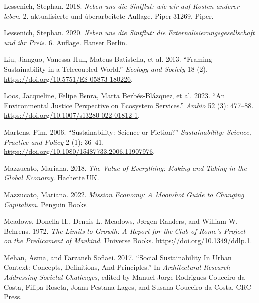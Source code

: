 \documentclass[
  a4paper,
  DIV=11,
  numbers=noendperiod,
  oneside,
  openany]{scrreprt}
\newlength{\cslhangindent}
\newenvironment{CSLReferences}[2] %
 {\begin{list}{}{%
  \setlength{\itemindent}{0pt}
  \setlength{\leftmargin}{0pt}
  \setlength{\parsep}{0pt}
  \ifodd #1
   \setlength{\leftmargin}{\cslhangindent}
   \setlength{\itemindent}{-1\cslhangindent}
  \fi
  \setlength{\itemsep}{#2\baselineskip}}}
 {\end{list}}
\begin{document}
\begin{CSLReferences}{1}{1}
Lessenich, Stephan. 2018. \emph{{Neben uns die Sintflut: wie wir auf
Kosten anderer leben}}. 2. aktualisierte und {ü}berarbeitete Auflage.
{Piper} 31269. Piper.

Lessenich, Stephan. 2020. \emph{{Neben uns die Sintflut: die
Externalisierungsgesellschaft und ihr Preis}}. 6. Auflage. Hanser
Berlin.

{Liu, Jianguo, Vanessa Hull, Mateus Batistella, et al.} 2013. {``Framing
{Sustainability} in a {Telecoupled World}.''} \emph{Ecology and Society}
18 (2). \url{https://doi.org/10.5751/ES-05873-180226}.

Loos, Jacqueline, Felipe Benra, Marta Berbés-Blázquez, et al. 2023.
{``An Environmental Justice Perspective on Ecosystem Services.''}
\emph{Ambio} 52 (3): 477--88.
\url{https://doi.org/10.1007/s13280-022-01812-1}.

Martens, Pim. 2006. {``Sustainability: Science or Fiction?''}
\emph{Sustainability: Science, Practice and Policy} 2 (1): 36--41.
\url{https://doi.org/10.1080/15487733.2006.11907976}.

Mazzucato, Mariana. 2018. \emph{The Value of Everything: {Making} and
Taking in the Global Economy}. Hachette UK.

Mazzucato, Mariana. 2022. \emph{Mission Economy: A Moonshot Guide to
Changing Capitalism}. Penguin Books.

Meadows, Donella H., Dennis L. Meadows, Jørgen Randers, and William W.
Behrens. 1972. \emph{The {Limits} to {Growth}: {A} Report for the {Club}
of {Rome}'s {Project} on the {Predicament} of {Mankind}}. Universe
Books. \url{https://doi.org/10.1349/ddlp.1}.

Mehan, Asma, and Farzaneh Soflaei. 2017. {``Social {Sustainability In
Urban Context}: {Concepts}, {Definitions}, {And Principles}.''} In
\emph{Architectural {Research Addressing Societal Challenges}}, edited
by Manuel Jorge Rodrigues Couceiro da Costa, Filipa Roseta, Joana
Pestana Lages, and Susana Couceiro da Costa. CRC Press.


\end{CSLReferences}
\end{document}
